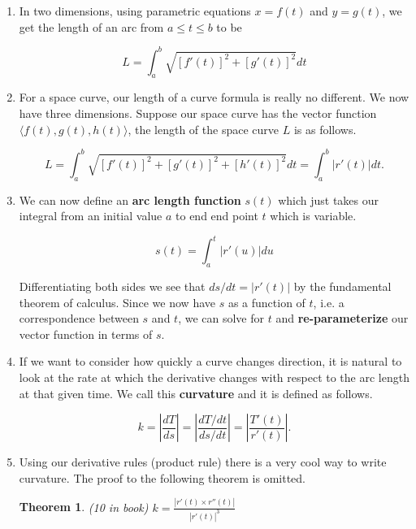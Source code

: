 \documentclass[11pt]{article}
\newtheorem{theorem}{Theorem}
\begin{document}
\begin{enumerate}
\item  In two dimensions, using parametric equations $x = f(t)$ and $y=g(t)$, we get the length of an arc from $a \leq t \leq b$ to be

\begin{equation*}
    L = \int_a^b \sqrt{[f'(t)]^2+[g'(t)]^2}dt 
\end{equation*}

\item For a space curve, our length of a curve formula is really no different. We now have three dimensions. Suppose our space curve has the vector function $\langle f(t), g(t), h(t)\rangle$, the length of the space curve $L$ is as follows.

\begin{equation*}
  L=  \int_a^b \sqrt{[f'(t)]^2+[g'(t)]^2+[h'(t)]^2}dt = \int_a^b |r'(t)|dt.
\end{equation*}

\item We can now define an \textbf{arc length function} $s(t)$ which just takes our integral from an initial value $a$ to end end point $t$ which is variable.

\begin{equation*}
    s(t) = \int_a^t |r'(u)|du
\end{equation*}

Differentiating both sides we see that $ds/dt = |r'(t)|$ by the fundamental theorem of calculus. Since we now have $s$ as a function of $t$, i.e. a correspondence between $s$ and $t$, we can solve for $t$ and \textbf{re-parameterize} our vector function in terms of $s$.

\item If we want to consider how quickly a curve changes direction, it is natural to look at the rate at which the derivative changes with respect to the arc length at that given time. We call this \textbf{curvature} and it is defined as follows.

\begin{equation*}
    k = \left|\frac{dT}{ds}\right| = \left| \frac{dT/dt}{ds/dt} \right| = \left| \frac{T'(t)}{r'(t)}\right|.
\end{equation*}

\item Using our derivative rules (product rule) there is a very cool way to write curvature. The proof to the following theorem is omitted.

\begin{theorem}(10 in book)
    $k = \frac{|r'(t) \times r''(t)|}{|r'(t)|^3}$
\end{theorem}


\end{enumerate}
\end{document}
